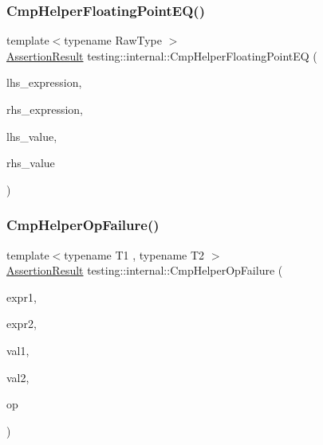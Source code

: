 \mbox{\label{namespacetesting_1_1internal_a98ce463e5dbe0c6120fa817e1f8f2944}} 
\subsubsection{\texorpdfstring{CmpHelperFloatingPointEQ()}{CmpHelperFloatingPointEQ()}}
{\footnotesize\ttfamily template$<$typename Raw\+Type $>$ \\
\mbox{\hyperlink{classtesting_1_1_assertion_result}{Assertion\+Result}} testing\+::internal\+::\+Cmp\+Helper\+Floating\+Point\+EQ (\begin{DoxyParamCaption}\item[{const char $\ast$}]{lhs\+\_\+expression,  }\item[{const char $\ast$}]{rhs\+\_\+expression,  }\item[{Raw\+Type}]{lhs\+\_\+value,  }\item[{Raw\+Type}]{rhs\+\_\+value }\end{DoxyParamCaption})}

\mbox{\label{namespacetesting_1_1internal_a894ffccd936d78fd555f490020c27f0a}} 
\subsubsection{\texorpdfstring{CmpHelperOpFailure()}{CmpHelperOpFailure()}}
{\footnotesize\ttfamily template$<$typename T1 , typename T2 $>$ \\
\mbox{\hyperlink{classtesting_1_1_assertion_result}{Assertion\+Result}} testing\+::internal\+::\+Cmp\+Helper\+Op\+Failure (\begin{DoxyParamCaption}\item[{const char $\ast$}]{expr1,  }\item[{const char $\ast$}]{expr2,  }\item[{const T1 \&}]{val1,  }\item[{const T2 \&}]{val2,  }\item[{const char $\ast$}]{op }\end{DoxyParamCaption})}

